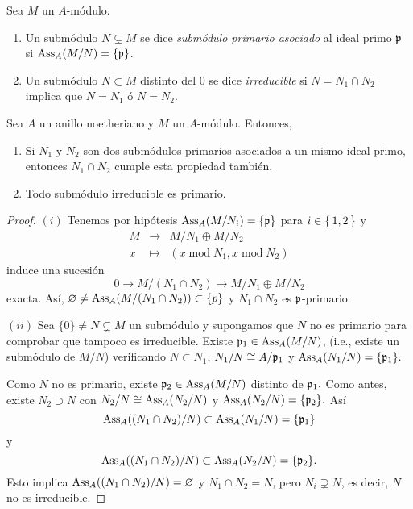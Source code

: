 \documentclass[../main.tex]{subfiles}
\begin{document}
\begin{definition} Sea $M$ un $A$-módulo. \begin{enumerate}
    \item Un submódulo $N\varsubsetneq M$ se dice \textit{submódulo primario asociado} al ideal primo $\mathfrak{p}$ si $\text{Ass}_A(M/N)=\{\mathfrak{p}\}$.
    \item Un submódulo $N\subset M$ distinto del $0$ se dice \textit{irreducible} si $N=N_1\cap N_2$ implica que $N=N_1$ ó $N=N_2$.
\end{enumerate}
\end{definition}
\begin{lemma}
Sea $A$ un anillo noetheriano y $M$ un $A$-módulo. Entonces,\begin{enumerate}
    \item Si $N_1$ y $N_2$ son dos submódulos primarios asociados a un mismo ideal primo, entonces $N_1\cap N_2$ cumple esta propiedad también.
    \item Todo submódulo irreducible es primario.
\end{enumerate}
\end{lemma}

\begin{proof}
$(i)$ Tenemos por hipótesis $\text{Ass}_A(M/N_i)=\{\mathfrak{p}\}$ para $i\in\set{1,2}$ y
$$\begin{array}{rcl}
    M&\longrightarrow& M/N_1\oplus M/N_2\\
    x&\longmapsto&(x\operatorname{mod}  N_1,x\operatorname{mod} N_2)
\end{array}$$
induce una sucesión
$$0\longrightarrow M/(N_1\cap N_2)\longrightarrow M/N_1\oplus M/N_2$$
exacta. Así, $\varnothing\neq \text{Ass}_A(M/(N_1\cap N_2))\subset \{p\}$ y $N_1\cap N_2$ es $\mathfrak{p}$-primario.

$(ii)$ Sea $\{0\}\neq N\subsetneq M$ un submódulo y supongamos que $N$ no es primario para comprobar que tampoco es irreducible. Existe $\mathfrak{p}_1\in\text{Ass}_A(M/N)$, (i.e., existe un submódulo de $M/N$) verificando $N\subset N_1$, $N_1/N\cong A/{\mathfrak{p}_1}$ y $\text{Ass}_A(N_1/N)=\{\mathfrak{p}_1\}.$

Como $N$ no es primario, existe $\mathfrak{p}_2\in\text{Ass}_A(M/N)$ distinto de $\mathfrak{p}_1.$ Como antes, existe $N_2\supset N$ con $N_2/N\cong\text{Ass}_A(N_2/N)$ y $\text{Ass}_A(N_2/N)=\{\mathfrak{p}_2\}.$ Así
$$\text{Ass}_A((N_1\cap N_2)/N)\subset\text{Ass}_A(N_1/N)=\{\mathfrak{p}_1\}$$
y
$$\text{Ass}_A((N_1\cap N_2)/N)\subset\text{Ass}_A(N_2/N)=\{\mathfrak{p}_2\}.$$
Esto implica $\text{Ass}_A((N_1\cap N_2)/N)=\varnothing$ y $N_1\cap N_2=N$, pero $N_i\supsetneq N$, es decir, $N$ no es irreducible.
\end{proof}
\end{document}
